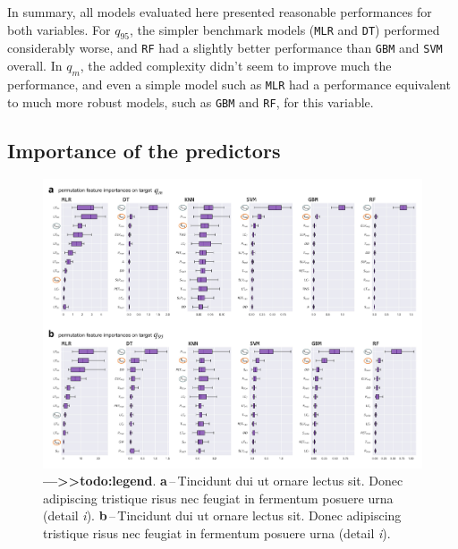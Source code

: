 \documentclass[12pt]{article}
\begin{document}
\par In summary, all models evaluated here presented reasonable performances for both variables. For $q_{95}$, the simpler benchmark models (\texttt{MLR} and \texttt{DT}) performed considerably worse, and \texttt{RF} had a slightly better performance than \texttt{GBM} and \texttt{SVM} overall. In $q_{m}$, the added complexity didn’t seem to improve much the performance, and even a simple model such as \texttt{MLR} had a performance equivalent to much more robust models, such as \texttt{GBM} and \texttt{RF}, for this variable.
\subsection{Importance of the predictors} \label{results:importance}

\begin{figure}[t!] %
	\centering                                       
	\includegraphics[width=0.98\linewidth]{figs/importance.jpg}    
	\caption[Importance of features]
	{ \textbf{---\;>>todo:legend}.
		\textbf{a}\,--\,Tincidunt dui ut ornare lectus sit. Donec adipiscing tristique risus nec feugiat in fermentum posuere urna (detail \textrm{\textit{i}}).
		\textbf{b}\,--\,Tincidunt dui ut ornare lectus sit. Donec adipiscing tristique risus nec feugiat in fermentum posuere urna (detail \textrm{\textit{i}}).		
	}
	\label{fig:importance}  %
\end{figure}
\end{document}
